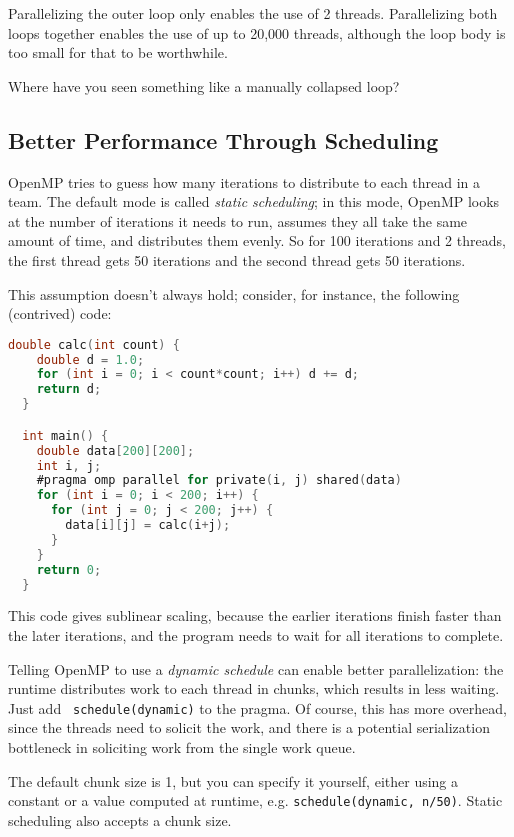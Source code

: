 Parallelizing the outer loop only enables the use of 2 threads.
Parallelizing both loops together enables the use of up to 20,000
threads, although the loop body is too small for that to be
worthwhile. 

{\sf Where have you seen something like a manually collapsed loop?}\\[1em]

\subsection*{Better Performance Through Scheduling}
OpenMP tries to guess how many iterations to distribute to each thread
in a team. The default mode is called \emph{static scheduling}; in
this mode, OpenMP looks at the number of iterations it needs to run,
assumes they all take the same amount of time, and distributes them
evenly. So for 100 iterations and 2 threads, the first thread gets 50
iterations and the second thread gets 50 iterations.

This assumption doesn't always hold; consider, for instance, the 
following (contrived) code:
{\small
\begin{lstlisting}[language=C,morekeywords={foreach,pragma,omp,parallel,single,nowait,task,untied,barrier,taskyield}]
  double calc(int count) {
    double d = 1.0;
    for (int i = 0; i < count*count; i++) d += d;
    return d;
  }

  int main() {
    double data[200][200];
    int i, j;
    #pragma omp parallel for private(i, j) shared(data)
    for (int i = 0; i < 200; i++) {
      for (int j = 0; j < 200; j++) {
        data[i][j] = calc(i+j);
      }
    }
    return 0;
  }
\end{lstlisting}
}
This code gives sublinear scaling, because the earlier iterations 
finish faster than the later iterations, and the program needs to wait
for all iterations to complete.

Telling OpenMP to use a \emph{dynamic schedule} can enable better
parallelization: the runtime distributes work to each thread in
chunks, which results in less waiting. Just add {\tt
  schedule(dynamic)} to the pragma. Of course, this has more overhead,
since the threads need to solicit the work, and there is a potential
serialization bottleneck in soliciting work from the single work
queue. 

The default chunk size is 1, but you can specify it yourself, either
using a constant or a value computed at runtime, e.g. 
{\tt schedule(dynamic, n/50)}. Static scheduling also accepts a
chunk size.

